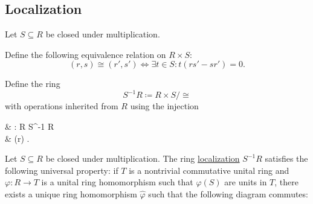 \subsection{Localization}\label{subsec:localization}

\begin{definition}\label{def:ring_localization}\mcite\cite[428]{Knapp2016BasicAlgebra}
  Let \( S \subseteq R \) be closed under multiplication.

  Define the following equivalence relation on \( R \times S \):
  \begin{equation*}
    (r, s) \cong (r', s') \iff \exists t \in S: t(rs' - sr') = 0.
  \end{equation*}

  Define the ring
  \begin{equation*}
    S^{-1} R \coloneqq R \times S / \cong
  \end{equation*}
  with operations inherited from \( R \) using the injection
  \begin{balign*}
     & \iota: R \to S^{-1} R        \\
     & \iota(r) \coloneqq [(r, 1)].
  \end{balign*}
\end{definition}

\begin{proposition}\label{thm:ring_localization_universal_property}\mcite\cite[431]{Knapp2016BasicAlgebra}
  Let \( S \subseteq R \) be closed under multiplication. The ring \hyperref[def:ring_localization]{localization} \( S^{-1} R \) satisfies the following universal property: if \( T \) is a nontrivial commutative unital ring and \( \varphi: R \to T \) is a unital ring homomorphism such that \( \varphi(S) \) are units in \( T \), there exists a unique ring homomorphism \( \hat \varphi \) such that the following diagram commutes:

  \begin{alignedeq}\label{thm:ring_localization_universal_property/diagram}
    \iffalse\begin{mplibcode}
      beginfig(1);
      input metapost/graphs;

      v1 := thelabel("$S^{-1} R$", origin);
      v2 := thelabel("$T$", (2, 0) scaled u);
      v3 := thelabel("$R$", (1, 1) scaled u);

      a1 := straight_arc(v3, v2);
      a2 := straight_arc(v3, v1);

      d1 := straight_arc(v1, v2);

      draw_vertices(v);
      draw_arcs(a);

      drawarrow d1 dotted;

      label.urt("$\varphi$", straight_arc_midpoint of a1);
      label.ulft("$\iota$", straight_arc_midpoint of a2);
      label.top("$\hat\varphi$", straight_arc_midpoint of d1);
      endfig;
    \end{mplibcode}\fi
  \end{alignedeq}
\end{proposition}

